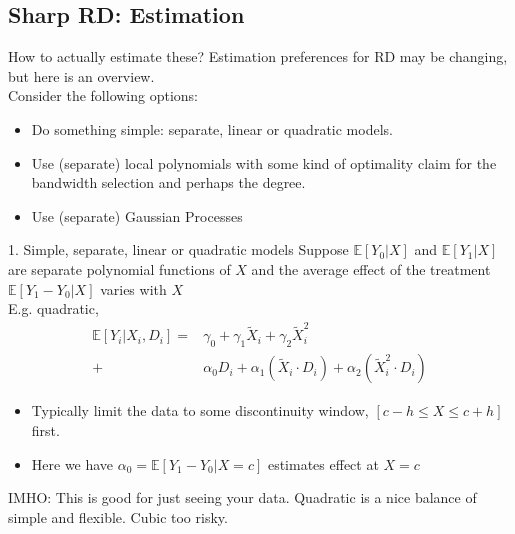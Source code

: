 \documentclass[xcolor=dvipsnames]{beamer}
\newcommand\E{\mathbb{E}}
\begin{document}
\subsection{Sharp RD: Estimation}

\begin{frame}{How to actually estimate these?}
 Estimation preferences for RD may be changing,  but here is an overview.\\
\bigskip
{} Consider the following options:
\begin{itemize}
\item Do something simple: separate, linear or quadratic models.
\medskip
\item Use (separate) local polynomials with some kind of optimality claim for the bandwidth selection and perhaps the degree.
\medskip
\item Use (separate) Gaussian Processes
\end{itemize}
\end{frame}

\begin{frame}{1. Simple, separate, linear or quadratic models}
\small
{} Suppose $\E[Y_0|X]$ and $\E[Y_1|X]$ are separate polynomial functions of $X$ and the average effect of the treatment $\E[Y_1-Y_0|X]$ varies with $X$ \\
\medskip
{} E.g. quadratic, \\
\begin{align*}
\E[Y_i|X_i,D_i]=& \gamma_0 + \gamma_1 \tilde{X}_i + \gamma_2 \tilde{X}_i^2\\
+&\alpha_0 D_i + \alpha_1 (\tilde{X}_i\cdot D_i) + \alpha_2 (\tilde{X}_i^2\cdot D_i)
\end{align*}
\footnotesize
\begin{itemize}
\item<4-> Typically limit the data to some discontinuity window, $[c-h \leq X \leq c+h]$ first. 
\item<5-> Here we have $\alpha_0 = \E[Y_1-Y_0|X=c]$ estimates effect at $X=c$
\end{itemize}
 IMHO: This is good for just seeing your data. Quadratic is a nice balance of simple and flexible. Cubic too risky.
\end{frame}
\end{document}
